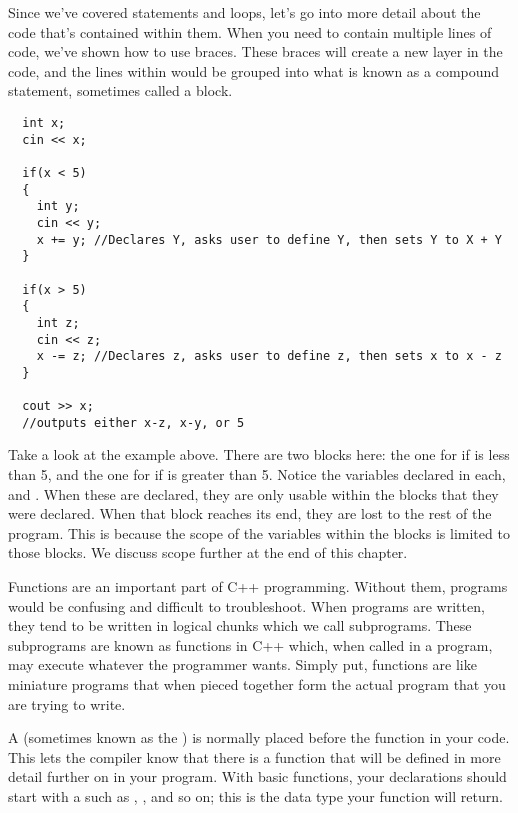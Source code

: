 
Since we've covered  statements and loops, let's go into more detail about the code that's contained within them. 
When you need to contain multiple lines of code, we've shown how to use braces. 
These braces will create a new layer in the code, and the lines within would be grouped into what is known as a compound statement, sometimes called a block.

\begin{lstlisting}
  int x;
  cin << x;

  if(x < 5)
  {
    int y;
    cin << y;	
    x += y;	//Declares Y, asks user to define Y, then sets Y to X + Y
  }

  if(x > 5)
  {
    int z;
    cin << z;
    x -= z;	//Declares z, asks user to define z, then sets x to x - z
  }

  cout >> x;
  //outputs either x-z, x-y, or 5
\end{lstlisting}

Take a look at the example above. 
There are two blocks here: the one for if  is less than 5, and the one for if  is greater than 5. 
Notice the variables declared in each,  and . 
When these are declared, they are only usable within the blocks that they were declared. 
When that block reaches its end, they are lost to the rest of the program. 
This is because the scope of the variables within the blocks is limited to those blocks.
We discuss scope further at the end of this chapter.

 
 
Functions are an important part of C++ programming. 
Without them, programs would be confusing and difficult to troubleshoot. 
When programs are written, they tend to be written in logical chunks which we call subprograms. 
These subprograms are known as functions in C++ which, when called in a program, may execute whatever the programmer wants. 
Simply put, functions are like miniature programs that when pieced together form the actual program that you are trying to write.
 
 
A  (sometimes known as the ) is normally placed before the  function in your code. 
This lets the compiler know that there is a function that will be defined in more detail further on in your program. 
With basic functions, your declarations should start with a  such as , , and so on; this is the data type your function will return. 


